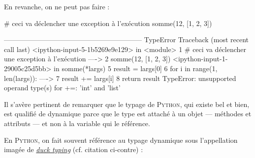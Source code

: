 En revanche, on ne peut pas faire :

\begin{nbjupyterin}[before skip=4pt, after skip=1pt]{5}
# ceci va déclencher une exception à l'exécution
somme(12, [1, 2, 3])
\end{nbjupyterin}
\begin{nbjupyterout}[before skip=1pt, after skip=4pt]{5}
------------------------------------------------------------
TypeError                  Traceback (most recent call last)
<ipython-input-5-1b5269e9e129> in <module>
      1 # ceci va déclencher une exception à l'exécution
----> 2 somme(12, [1, 2, 3])
<ipython-input-1-29005c25d5bb> in somme(*largs)
      5     result = largs[0]
      6     for i in range(1, len(largs)):
----> 7         result += largs[i]
      8     return result
TypeError: unsupported operand type(s) for +=: 'int' and 'list'
\end{nbjupyterout}

Il s'avère pertinent de remarquer que le typage de \textsc{Python}, qui existe bel et bien, est qualifié de dynamique parce que le type est attaché à un objet --- méthodes et attributs --- et non à la variable qui le référence.

En \textsc{Python}, on fait souvent référence au typage dynamique sous l'appellation imagée de 
\href{https://fr.wikipedia.org/wiki/Duck\_typing}{\textit{duck typing}} (cf. citation ci-contre) :

